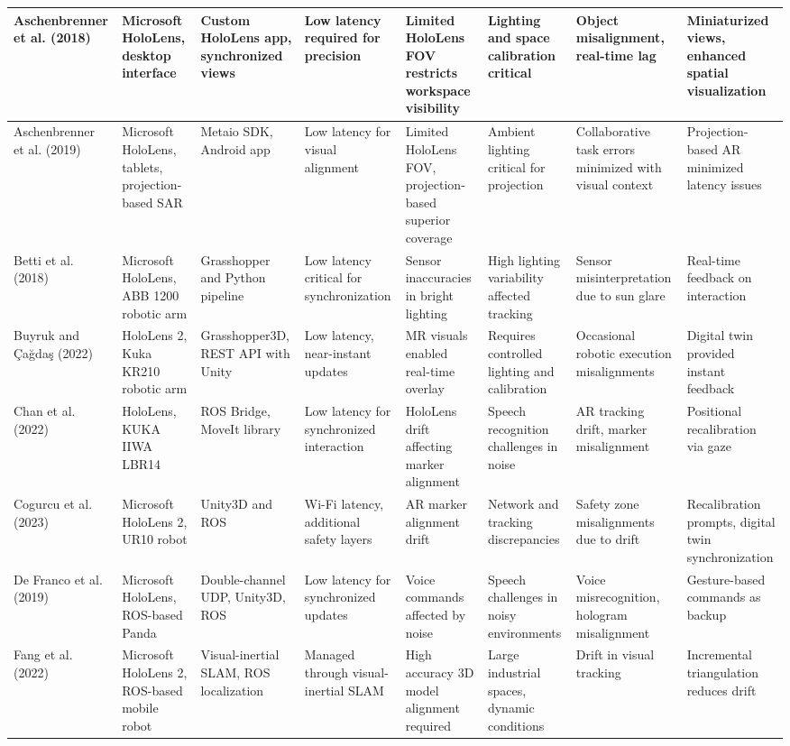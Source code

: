 {\begin{landscape}
\begin{longtable}{@{}p{1.8cm}p{1.8cm}p{1.8cm}p{1.8cm}p{1.8cm}p{1.8cm}p{1.8cm}p{1.8cm}@{}}
Aschenbrenner et al. (2018) & Microsoft HoloLens, desktop interface & Custom HoloLens app, synchronized views & Low latency required for precision & Limited HoloLens FOV restricts workspace visibility & Lighting and space calibration critical & Object misalignment, real-time lag & Miniaturized views, enhanced spatial visualization \\
\midrule
Aschenbrenner et al. (2019) & Microsoft HoloLens, tablets, projection-based SAR & Metaio SDK, Android app & Low latency for visual alignment & Limited HoloLens FOV, projection-based superior coverage & Ambient lighting critical for projection & Collaborative task errors minimized with visual context & Projection-based AR minimized latency issues \\
\midrule
Betti et al. (2018) & Microsoft HoloLens, ABB 1200 robotic arm & Grasshopper and Python pipeline & Low latency critical for synchronization & Sensor inaccuracies in bright lighting & High lighting variability affected tracking & Sensor misinterpretation due to sun glare & Real-time feedback on interaction \\
\midrule
Buyruk and Çağdaş (2022) & HoloLens 2, Kuka KR210 robotic arm & Grasshopper3D, REST API with Unity & Low latency, near-instant updates & MR visuals enabled real-time overlay & Requires controlled lighting and calibration & Occasional robotic execution misalignments & Digital twin provided instant feedback \\
\midrule
Chan et al. (2022) & HoloLens, KUKA IIWA LBR14 & ROS Bridge, MoveIt library & Low latency for synchronized interaction & HoloLens drift affecting marker alignment & Speech recognition challenges in noise & AR tracking drift, marker misalignment & Positional recalibration via gaze \\
\midrule
Cogurcu et al. (2023) & Microsoft HoloLens 2, UR10 robot & Unity3D and ROS & Wi-Fi latency, additional safety layers & AR marker alignment drift & Network and tracking discrepancies & Safety zone misalignments due to drift & Recalibration prompts, digital twin synchronization \\
\midrule
De Franco et al. (2019) & Microsoft HoloLens, ROS-based Panda & Double-channel UDP, Unity3D, ROS & Low latency for synchronized updates & Voice commands affected by noise & Speech challenges in noisy environments & Voice misrecognition, hologram misalignment & Gesture-based commands as backup \\
\midrule
Fang et al. (2022) & Microsoft HoloLens 2, ROS-based mobile robot & Visual-inertial SLAM, ROS localization & Managed through visual-inertial SLAM & High accuracy 3D model alignment required & Large industrial spaces, dynamic conditions & Drift in visual tracking & Incremental triangulation reduces drift \\

\end{longtable}
\end{landscape}}
